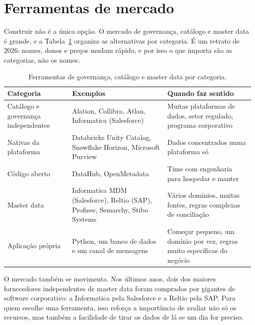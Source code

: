 \section{Ferramentas de mercado}
\label{sec:gov-ferramentas}

Construir não é a única opção. O mercado de governança, catálogo e master data é grande, e
a Tabela~\ref{tab:ferramentas-governanca} organiza as alternativas por categoria. É um
retrato de 2026: nomes, donos e preços mudam rápido, e por isso o que importa são as
categorias, não os nomes.

\begin{table}[htbp]
  \centering
  \caption{Ferramentas de governança, catálogo e master data por categoria.}
  \label{tab:ferramentas-governanca}
  \small
  \begin{tabularx}{\textwidth}{@{}>{\raggedright\arraybackslash}p{}
      >{\raggedright\arraybackslash}X>{\raggedright\arraybackslash}X@{}}
    \toprule
    Categoria & Exemplos & Quando faz sentido \\
    \midrule
    Catálogo e governança independentes & Alation, Collibra, Atlan, Informatica (Salesforce) & Muitas plataformas de dados, setor regulado, programa corporativo \\
    \addlinespace
    Nativas da plataforma & Databricks Unity Catalog, Snowflake Horizon, Microsoft Purview & Dados concentrados numa plataforma só \\
    \addlinespace
    Código aberto & DataHub, OpenMetadata & Time com engenharia para hospedar e manter \\
    \addlinespace
    Master data & Informatica MDM (Salesforce), Reltio (SAP), Profisee, Semarchy, Stibo Systems & Vários domínios, muitas fontes, regras complexas de conciliação \\
    \addlinespace
    Aplicação própria & Python, um banco de dados e um canal de mensagens & Começar pequeno, um domínio por vez, regras muito específicas do negócio \\
    \bottomrule
  \end{tabularx}
\end{table}

O mercado também se movimenta. Nos últimos anos, dois dos maiores fornecedores
independentes de master data foram comprados por gigantes de software corporativo: a
Informatica pela Salesforce e a Reltio pela SAP.  Para quem escolhe uma ferramenta, isso reforça a importância
de avaliar não só os recursos, mas também a facilidade de tirar os dados de lá se um dia
for preciso.

